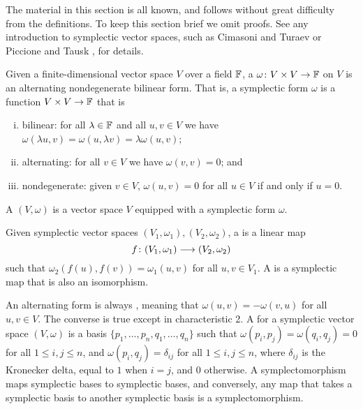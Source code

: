The material in this section is all known, and follows without great difficulty
from the definitions. To keep this section brief we omit proofs. See any
introduction to symplectic vector spaces, such as Cimasoni and Turaev \cite{CT} or
Piccione and Tausk \cite{PT}, for details.

\begin{definition}
  Given a finite-dimensional vector space $V$ over a field ${\mathbb F}$, a 
  $\omega{\colon} V \times V \to {\mathbb F}$ on $V$ is an alternating nondegenerate bilinear
  form.  That is, a symplectic form $\omega$ is a function $V \times V \to {\mathbb F}$
  that is
  \begin{enumerate}[(i)]
    \item bilinear: for all $\lambda \in {\mathbb F}$ and all $u,v \in V$ we have
      $\omega(\lambda u,v) = \omega(u,\lambda v) =  \lambda \omega(u,v)$;
    \item alternating: for all $v \in V$ we have $\omega(v,v) = 0$; and
    \item nondegenerate: given $v \in V$, $\omega(u,v) = 0$ for all $u \in V$ if
      and only if $u = 0$.
  \end{enumerate} 
  A  $(V,\omega)$ is a vector space $V$ equipped
  with a symplectic form $\omega$. 

  Given symplectic vector spaces $(V_1,\omega_1), (V_2, \omega_2)$, a
   is a linear map 
  \[
    f{\colon} (V_1,\omega_1) \longrightarrow (V_2, \omega_2)
  \]
  such that $\omega_2(f(u),f(v)) = \omega_1(u,v)$ for all $u,v \in V_1$. A
   is a symplectic map that is also an isomorphism. 
\end{definition}

An alternating form is always , meaning that $\omega(u,v) = 
-\omega(v,u)$ for all $u,v \in V$.  The converse is true except in characteristic 2.
A  for a symplectic vector space $(V,\omega)$ is a
basis $\{p_1,\dots,p_n,q_1,\dots,q_n\}$ such that $\omega(p_i,p_j) =
\omega(q_i,q_j) = 0$ for all $1 \le i,j \le n$, and $\omega(p_i,q_j) =
\delta_{ij}$ for all $1 \le i,j\le n$, where $\delta_{ij}$ is the Kronecker delta,
equal to $1$ when $i =j$, and $0$ otherwise. A symplectomorphism maps symplectic
bases to symplectic bases, and conversely, any map that takes a symplectic basis
to another symplectic basis is a symplectomorphism.

